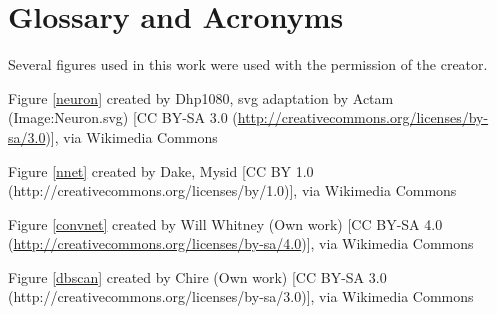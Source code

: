 \chapter{Glossary and Acronyms}
\label{app_credits}

Several figures used in this work were used with the permission of the creator.

Figure \ref{neuron} created by Dhp1080, svg adaptation by Actam (Image:Neuron.svg) [CC BY-SA 3.0 (\url{http://creativecommons.org/licenses/by-sa/3.0})], via Wikimedia Commons

Figure \ref{nnet} created by Dake, Mysid [CC BY 1.0 (http://creativecommons.org/licenses/by/1.0)], via Wikimedia Commons

Figure \ref{convnet} created by Will Whitney (Own work) [CC BY-SA 4.0 (\url{http://creativecommons.org/licenses/by-sa/4.0})], via Wikimedia Commons

Figure \ref{dbscan} created by Chire (Own work) [CC BY-SA 3.0 (http://creativecommons.org/licenses/by-sa/3.0)], via Wikimedia Commons
